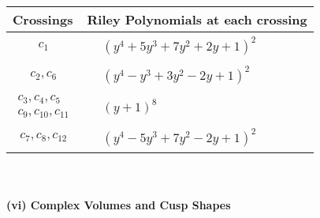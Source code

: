 \documentclass[1p]{elsarticle_modified}
\theoremstyle{definition}
\begin{document}
\begin{tabular}{m{50pt}|m{274pt}}
Crossings & \hspace{64pt}Riley Polynomials at each crossing \\
\hline $$\begin{aligned}c_{1}\end{aligned}$$&$\begin{aligned}
&(y^4+5 y^3+7 y^2+2 y+1)^2
\end{aligned}$\\
\hline $$\begin{aligned}c_{2},c_{6}\end{aligned}$$&$\begin{aligned}
&(y^4- y^3+3 y^2-2 y+1)^2
\end{aligned}$\\
\hline $$\begin{aligned}c_{3},c_{4},c_{5}\\c_{9},c_{10},c_{11}\end{aligned}$$&$\begin{aligned}
&(y+1)^8
\end{aligned}$\\
\hline $$\begin{aligned}c_{7},c_{8},c_{12}\end{aligned}$$&$\begin{aligned}
&(y^4-5 y^3+7 y^2-2 y+1)^2
\end{aligned}$\\
\hline
\end{tabular}\\~\\
\newpage\flushleft \textbf{(vi) Complex Volumes and Cusp Shapes}
\end{document}
